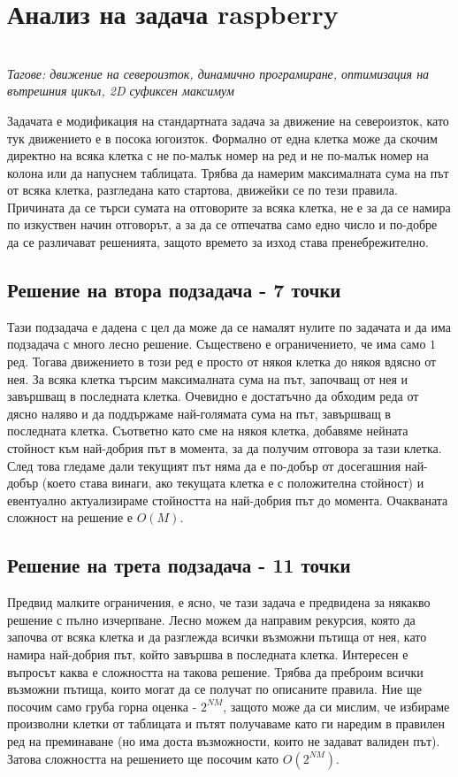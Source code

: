 \documentclass[12pt]{article}
\begin{document}
	
\section{Анализ на задача raspberry}
~\\
\indent\textit{Тагове: движение на североизток, динамично програмиране, оптимизация на вътрешния цикъл, 2D суфиксен максимум}

Задачата е модификация на стандартната задача за движение на североизток, като тук движението е в посока югоизток. Формално от една клетка може да скочим директно на всяка клетка с не по-малък номер на ред и не по-малък номер на колона или да напуснем таблицата. Трябва да намерим максималната сума на път от всяка клетка, разгледана като стартова, движейки се по тези правила. Причината да се търси сумата на отговорите за всяка клетка, не е за да се намира по изкуствен начин отговорът, а за да се отпечатва само едно число и по-добре да се различават решенията, защото времето за изход става пренебрежително.

\subsection{Решение на втора подзадача - 7 точки}
Тази подзадача е дадена с цел да може да се намалят нулите по задачата и да има подзадача с много лесно решение. Съществено е ограничението, че има само $1$ ред. Тогава движението в този ред е просто от някоя клетка до някоя вдясно от нея. За всяка клетка търсим максималната сума на път, започващ от нея и завършващ в последната клетка. Очевидно е достатъчно да обходим реда от дясно наляво и да поддържаме най-голямата сума на път, завършващ в последната клетка. Съответно като сме на някоя клетка, добавяме нейната стойност към най-добрия път в момента, за да получим отговора за тази клетка. След това гледаме дали текущият път няма да е по-добър от досегашния най-добър (което става винаги, ако текущата клетка е с положителна стойност) и евентуално актуализираме стойността на най-добрия път до момента. Очакваната сложност на решение е $O(M)$.

\subsection{Решение на трета подзадача - 11 точки}
Предвид малките ограничения, е ясно, че тази задача е предвидена за някакво решение с пълно изчерпване. Лесно можем да направим рекурсия, която да започва от всяка клетка и да разглежда всички възможни пътища от нея, като намира най-добрия път, който завършва в последната клетка. Интересен е въпросът каква е сложността на такова решение. Трябва да преброим всички възможни пътища, които могат да се получат по описаните правила. Ние ще посочим само груба горна оценка - $2^{NM}$, защото може да си мислим, че избираме произволни клетки от таблицата и пътят получаваме като ги наредим в правилен ред на преминаване (но има доста възможности, които не задават валиден път). Затова сложността на решението ще посочим като $O(2^{NM})$.
\end{document}
